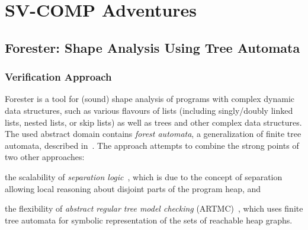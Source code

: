 





\chapter{SV-COMP Adventures}
\label{app:svcomp}
\section{Forester: Shape Analysis Using Tree Automata}\label{sec:verif_approach}
\subsection{Verification Approach}\label{sec:verif_approach}

Forester is a tool for (sound) shape analysis of programs with complex dynamic
data structures, such as various flavours of lists (including singly/doubly linked
lists, nested lists, or skip lists) as well as trees and other complex data
structures.
The used abstract domain contains \emph{forest automata}, a generalization of
finite tree automata, described in~\cite{habermehl:forest,holik:forest-boxes}.
The approach attempts to combine the strong points of two other approaches:
\begin{inparaenum}[(i)]
\item  the scalability of \emph{separation logic}~\cite{seplog}, which is due
  to the concept of separation allowing local reasoning about disjoint parts
  of the program heap, and
  \item  the flexibility of \emph{abstract regular tree model checking} (ARTMC)~\cite{artmc},
  which uses finite tree automata for symbolic representation of the sets of
  reachable heap graphs.
\end{inparaenum}

